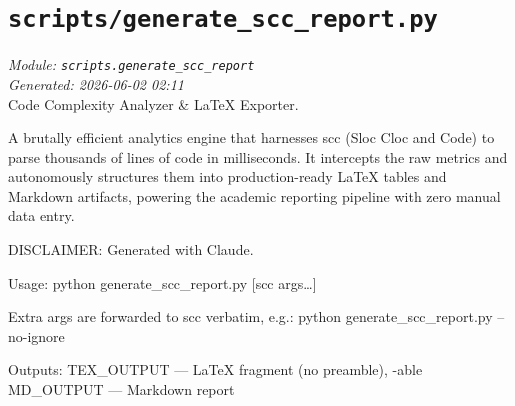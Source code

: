 
\section{\texttt{scripts/generate\_scc\_report.py}}
\textit{Module: \texttt{scripts.generate\_scc\_report}} \\
\textit{Generated: 2026-06-02 02:11} \\

Code Complexity Analyzer \& LaTeX Exporter.

A brutally efficient analytics engine that harnesses scc (Sloc Cloc and
Code) to parse thousands of lines of code in milliseconds. It intercepts
the raw metrics and autonomously structures them into production-ready
LaTeX tables and Markdown artifacts, powering the academic reporting
pipeline with zero manual data entry.

DISCLAIMER: Generated with Claude.

Usage: python generate\_scc\_report.py {[}scc args\ldots{]}

Extra args are forwarded to scc verbatim, e.g.: python
generate\_scc\_report.py --no-ignore

Outputs: TEX\_OUTPUT --- LaTeX fragment (no preamble), -able
MD\_OUTPUT --- Markdown report
